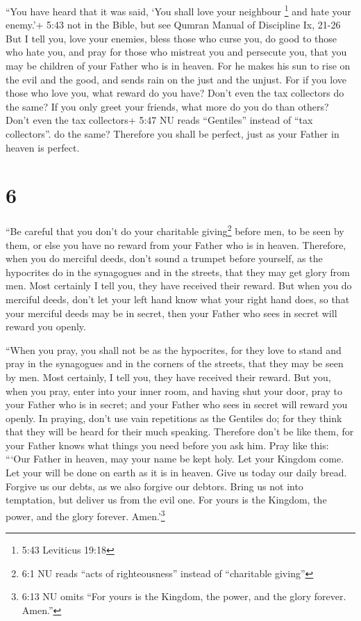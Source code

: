 ``You have heard that it was said, `You shall love your
neighbour \footnote{5:43 Leviticus 19:18} and hate your enemy.'+ 5:43
not in the Bible, but see Qumran Manual of Discipline Ix, 21-26
 But I tell you, love your enemies, bless those who curse
you, do good to those who hate you, and pray for those who mistreat you
and persecute you,  that you may be children of your Father
who is in heaven. For he makes his sun to rise on the evil and the good,
and sends rain on the just and the unjust.  For if you love
those who love you, what reward do you have? Don't even the tax
collectors do the same?  If you only greet your friends,
what more do you do than others? Don't even the tax collectors+ 5:47 NU
reads ``Gentiles'' instead of ``tax collectors''. do the same?
 Therefore you shall be perfect, just as your Father in
heaven is perfect.

\hypertarget{section-5}{%
\section{6}\label{section-5}}

 ``Be careful that you don't do your charitable
giving\footnote{6:1 NU reads ``acts of righteousness'' instead of
  ``charitable giving''} before men, to be seen by them, or else you
have no reward from your Father who is in heaven. 
Therefore, when you do merciful deeds, don't sound a trumpet before
yourself, as the hypocrites do in the synagogues and in the streets,
that they may get glory from men. Most certainly I tell you, they have
received their reward.  But when you do merciful deeds,
don't let your left hand know what your right hand does,  so
that your merciful deeds may be in secret, then your Father who sees in
secret will reward you openly.

 ``When you pray, you shall not be as the hypocrites, for
they love to stand and pray in the synagogues and in the corners of the
streets, that they may be seen by men. Most certainly, I tell you, they
have received their reward.  But you, when you pray, enter
into your inner room, and having shut your door, pray to your Father who
is in secret; and your Father who sees in secret will reward you openly.
 In praying, don't use vain repetitions as the Gentiles do;
for they think that they will be heard for their much speaking.
 Therefore don't be like them, for your Father knows what
things you need before you ask him.  Pray like this: ```Our
Father in heaven, may your name be kept holy.  Let your
Kingdom come. Let your will be done on earth as it is in heaven.
 Give us today our daily bread.  Forgive us
our debts, as we also forgive our debtors.  Bring us not
into temptation, but deliver us from the evil one. For yours is the
Kingdom, the power, and the glory forever. Amen.'\footnote{6:13 NU omits
  ``For yours is the Kingdom, the power, and the glory forever. Amen.''}

